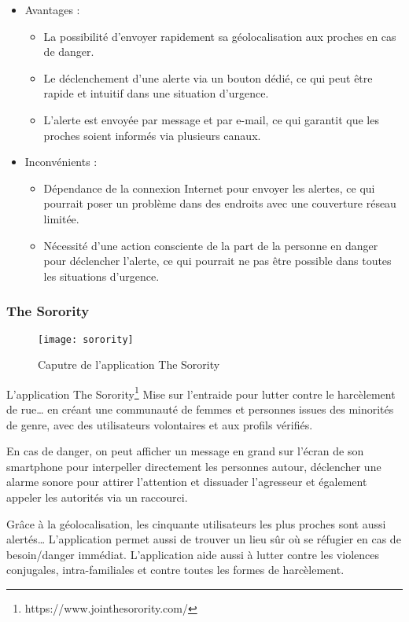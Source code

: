 \begin{itemize}
	\item Avantages :
	\begin{itemize}
		\item La possibilité d'envoyer rapidement sa géolocalisation aux proches en cas de danger.
		\item Le déclenchement d'une alerte via un bouton dédié, ce qui peut être rapide et intuitif dans une situation d'urgence.
		\item L'alerte est envoyée par message et par e-mail, ce qui garantit que les proches soient informés via plusieurs canaux.
	\end{itemize}
	
	\item Inconvénients :
	\begin{itemize}
		\item Dépendance de la connexion Internet pour envoyer les alertes, ce qui pourrait poser un problème dans des endroits avec une couverture réseau limitée.
		
		\item Nécessité d'une action consciente de la part de la personne en danger pour déclencher l'alerte, ce qui pourrait ne pas être possible dans toutes les situations d'urgence.
	\end{itemize}
	
\end{itemize}

\subsubsection{The Sorority}
\begin{figure}[H]
	\centering
	\texttt{[image: sorority]}
	\caption{Caputre de l’application The Sorority}
\end{figure}

L’application The Sorority\footnote{https://www.jointhesorority.com/} Mise sur l’entraide pour lutter contre le harcèlement de rue… en créant une communauté de femmes et personnes issues des minorités de genre, avec des utilisateurs volontaires et aux profils vérifiés. 

En cas de danger, on peut afficher un message en grand sur l’écran de son smartphone pour interpeller directement les personnes autour, déclencher une alarme sonore pour attirer l’attention et dissuader l’agresseur et également appeler les autorités via un raccourci.

Grâce à la géolocalisation, les cinquante utilisateurs les plus proches sont aussi alertés… L’application permet aussi de trouver un lieu sûr où se réfugier en cas de besoin/danger immédiat. L’application aide aussi à lutter contre les violences conjugales, intra-familiales et contre toutes les formes de harcèlement.

